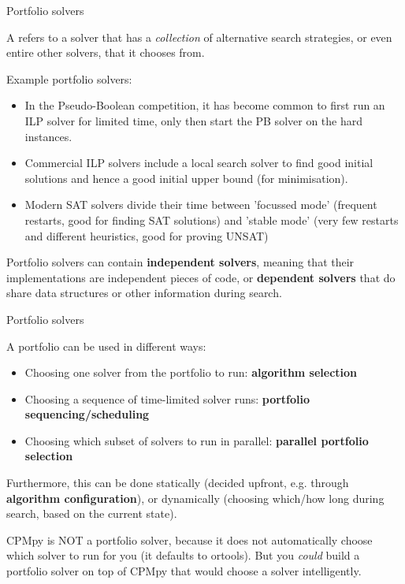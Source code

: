 \documentclass{cons-beamer}
\begin{document}
\begin{frame}{Portfolio solvers}
  \begin{definition}
    A  refers to a solver that has a \textit{collection} of alternative search strategies, or even entire other solvers, that it chooses from.
  \end{definition}
  \vfill
  
  Example portfolio solvers:
  {\small
  \begin{itemize}
  	\item In the Pseudo-Boolean competition, it has become common to first run an ILP solver for limited time, only then start the PB solver on the hard instances.
  	\item Commercial ILP solvers include a local search solver to find good initial solutions and hence a good initial upper bound (for minimisation).
  	\item Modern SAT solvers divide their time between 'focussed mode' (frequent restarts, good for finding SAT solutions) and 'stable mode' (very few restarts and different heuristics, good for proving UNSAT)
  \end{itemize}
  }
  \vfill
  \pause

  Portfolio solvers can contain \textbf{independent solvers}, meaning that their implementations are independent pieces of code, or \textbf{dependent solvers} that do share data structures or other information during search.
\end{frame}


\begin{frame}{Portfolio solvers}
	
	A portfolio can be used in different ways:
	\begin{itemize}
		\item Choosing one solver from the portfolio to run: \textbf{algorithm selection}
		\item Choosing a sequence of time-limited solver runs: \textbf{portfolio sequencing/scheduling}
		\item Choosing which subset of solvers to run in parallel: \textbf{parallel portfolio selection}
	\end{itemize}
	Furthermore, this can be done statically (decided upfront, e.g. through \textbf{algorithm configuration}), or dynamically (choosing which/how long during search, based on the current state).
	\vfill
	\pause
	
	CPMpy is NOT a portfolio solver, because it does not automatically choose which solver to run for you (it defaults to ortools). But you \textit{could} build a portfolio solver on top of CPMpy that would choose a solver intelligently. 
	
\end{frame}
\end{document}
